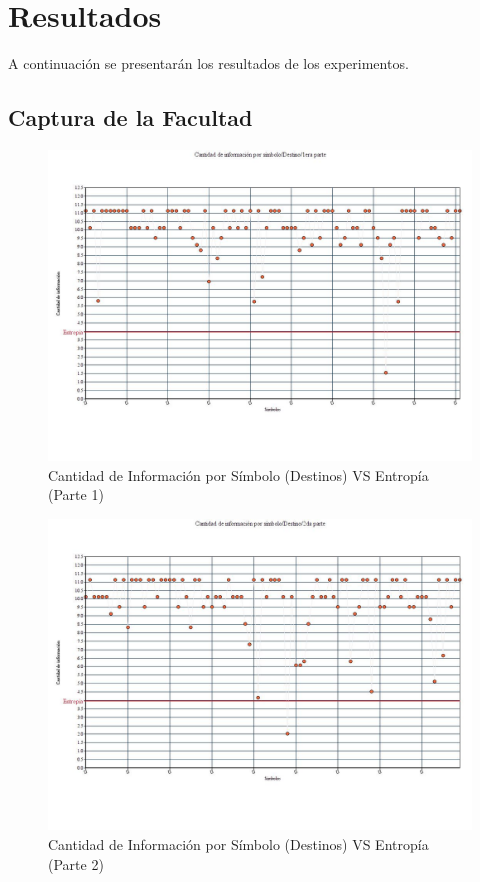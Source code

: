 \section{Resultados}
A continuación se presentarán los resultados de los experimentos.

\subsection{Captura de la Facultad}

\begin{figure}[H]
  \centering
    \includegraphics[scale=0.45]{imagenes/graficos/entropiaCantInf/02destino1eraParte.jpg}
  \caption{Cantidad de Información por Símbolo (Destinos) VS Entropía (Parte 1)}
  \label{fig:ejemplo}
\end{figure}
\begin{figure}[H]
  \centering
    \includegraphics[scale=0.45]{imagenes/graficos/entropiaCantInf/02destino2daParte.jpg}
  \caption{Cantidad de Información por Símbolo (Destinos) VS Entropía (Parte 2)}
  \label{fig:ejemplo}
\end{figure}

